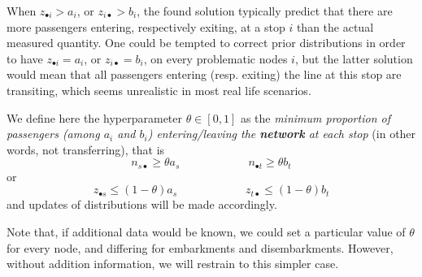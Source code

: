 \documentclass{bmcart}
\begin{document}
When $z_{\bullet i} > a_i$, or $z_{i \bullet} > b_i$, the found solution typically predict that there are more passengers entering, respectively exiting, at a stop $i$ than the actual measured quantity. One could be tempted to correct prior distributions in order to have $z_{\bullet i} = a_i$, or $z_{i \bullet} = b_i$, on every problematic nodes $i$, but the latter solution would mean that all passengers entering (resp. exiting) the line at this stop are transiting, which seems unrealistic in most real life scenarios.

We define here the hyperparameter $ \theta\in [0, 1]$ as the \emph{minimum proportion of passengers (among $a_i$ and $b_i$) entering/leaving the \textbf{network} at each stop} (in other words, not transferring), that is
\begin{equation}
n_{s\bullet}\ge \theta a_s \qquad\qquad \qquad n_{\bullet t}\ge \theta b_t
\end{equation}
or 
\begin{equation}
	z_{\bullet s} \le (1 - \theta) a_s\qquad\qquad \qquad z_{t \bullet} \le  (1 - \theta) b_t
\end{equation}
and updates of distributions will be made accordingly.

Note that, if additional data would be known, we could set a particular value of $\theta$ for every node, and differing for embarkments and disembarkments. However, without addition information, we will restrain to this simpler case. 
\end{document}

